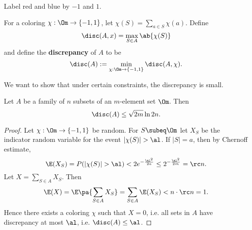 Label red and blue by $-1$ and $1$. 
\begin{df}
For a coloring $\chi:\Om\to \{-1,1\}$, let $\chi(S)=\sum_{a\in S} \chi(a)$. Define %
\[
\disc(A,x)=\max_{S\in A} \ab{\chi(S)}
\]
and define the \textbf{discrepancy} of $A$ to be
\[
\disc(A):=\min_{\chi:\Om\to\{-1,1\}}\disc(A,\chi).
\]
\end{df}
We want to show that under certain constraints, the discrepancy is small.
\begin{thm}
Let $A$ be a family of $n$ subsets of an $m$-element set $\Om$. Then
\[
\disc(A)\le \sqrt{2m}\ln 2n.
\]
\end{thm}
\begin{proof}
Let $\chi:\Om\to \{-1,1\}$ be random. For $S\subeq \Om$ let $X_S$ be the indicator random variable for the event $|\chi(S)|>\al$. If $|S|=a$, then by Chernoff estimate,
\[
\E(X_S)=P(|\chi(S)|>\al)<2e^{-\frac{\al^2}{2a}}\le 2^{-\frac{\al^2}{2m}}=\rc n.
\]
Let $X=\sum_{S\in A} X_S$. Then
\[
\E(X)=\E\pa{\sum_{S\in A} X_S}=\sum_{S\in A} \E(X_S)<n\cdot \rc n=1.
\]
Hence there exists a coloring $\chi$ such that $X=0$, i.e. all sets in $A$ have discrepancy at most $\al$, i.e. $\disc(A)\le \al$.
\end{proof}